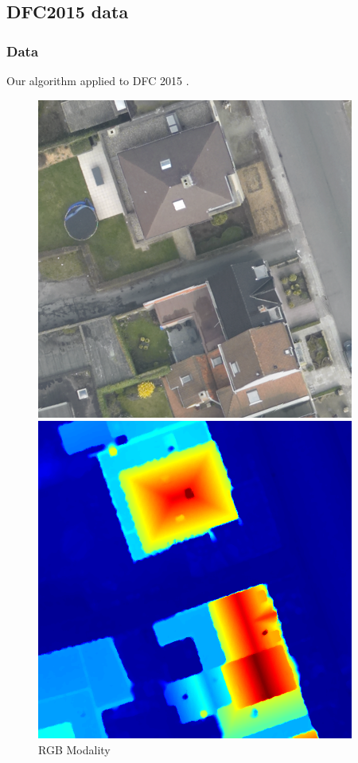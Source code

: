 \documentclass{beamer}
\begin{document}
\subsection{DFC2015 data}
\begin{frame}
  \frametitle{Data}
  Our algorithm applied to DFC 2015 \cite{DFC2015}.
  \begin{figure}[ht]
    \begin{minipage}[b]{0.45\linewidth}
      \centering
      \includegraphics[width=\textwidth]{./Images/DFC2015/optical.png}
      \caption{RGB Modality}
    \end{minipage}
    \begin{minipage}[b]{0.45\linewidth}
      \centering
      \includegraphics[width=\textwidth]{./Images/DFC2015/lidarColor.png}

\end{minipage}
\end{figure}
\end{frame}
\end{document}
